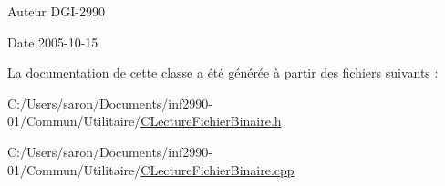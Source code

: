 \begin{DoxyAuthor}{Auteur}
D\-G\-I-\/2990 
\end{DoxyAuthor}
\begin{DoxyDate}{Date}
2005-\/10-\/15 
\end{DoxyDate}


La documentation de cette classe a été générée à partir des fichiers suivants \-:\begin{DoxyCompactItemize}
\item 
C\-:/\-Users/saron/\-Documents/inf2990-\/01/\-Commun/\-Utilitaire/\hyperlink{_c_lecture_fichier_binaire_8h}{C\-Lecture\-Fichier\-Binaire.\-h}\item 
C\-:/\-Users/saron/\-Documents/inf2990-\/01/\-Commun/\-Utilitaire/\hyperlink{_c_lecture_fichier_binaire_8cpp}{C\-Lecture\-Fichier\-Binaire.\-cpp}\end{DoxyCompactItemize}
